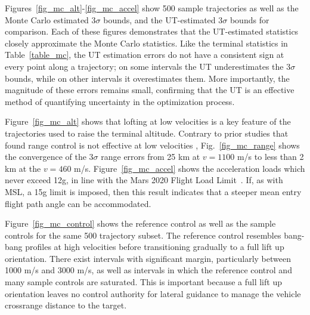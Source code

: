 \documentclass[journal ]{new-aiaa}
\begin{document}
Figures~\ref{fig_mc_alt}-\ref{fig_mc_accel} show 500 sample trajectories as well as the Monte Carlo estimated 3$\sigma$ bounds, and the UT-estimated 3$\sigma$ bounds for comparison. Each of these figures demonstrates that the UT-estimated statistics closely approximate the Monte Carlo statistics. Like the terminal statistics in Table~\ref{table_mc}, the UT estimation errors do not have a consistent sign at every point along a trajectory; on some intervals the UT underestimates the 3$\sigma$ bounds, while on other intervals it overestimates them. More importantly, the magnitude of these errors remains small, confirming that the UT is an effective method of quantifying uncertainty in the optimization process. 

Figure~\ref{fig_mc_alt} shows that lofting at low velocities is a key feature of the trajectories used to raise the terminal altitude. Contrary to prior studies that found range control is not effective at low velocities \cite{MSL_EDL2}, Fig.~\ref{fig_mc_range} shows the convergence of the 3$\sigma$ range errors from 25 km at $ v=1100 $ m/s to less than 2 km at the $v=460$ m/s. 
Figure~\ref{fig_mc_accel} shows the acceleration loads which never exceed 12g, in line with the Mars 2020 Flight Load Limit~\cite{Mars2020edl}. If, as with MSL, a 15g limit is imposed, then this result indicates that a steeper mean entry flight path angle can be accommodated.

Figure~\ref{fig_mc_control} shows the reference control as well as the sample controls for the same 500 trajectory subset. The reference control resembles bang-bang profiles at high velocities before transitioning gradually to a full lift up orientation. There exist intervals with significant margin, particularly between 1000 m/s and 3000 m/s, as well as intervals in which the reference control and many sample controls are saturated. 
This is important because a full lift up orientation leaves no control authority for lateral guidance to manage the vehicle crossrange distance to the target.
\end{document}
